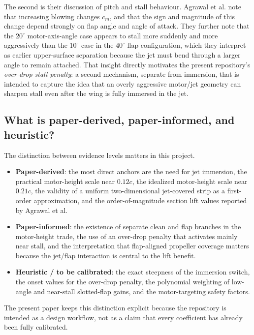 \documentclass[conf]{new-aiaa}
\begin{document}
The second is their discussion of pitch and stall behaviour. Agrawal et al. note that increasing blowing changes \(c_m\), and that the sign and magnitude of this change depend strongly on flap angle and angle of attack.\cite{Agrawal2019} They further note that the \(20^\circ\) motor-axis-angle case appears to stall more suddenly and more aggressively than the \(10^\circ\) case in the \(40^\circ\) flap configuration, which they interpret as earlier upper-surface separation because the jet must bend through a larger angle to remain attached.\cite{Agrawal2019} That insight directly motivates the present repository's \emph{over-drop stall penalty}: a second mechanism, separate from immersion, that is intended to capture the idea that an overly aggressive motor/jet geometry can sharpen stall even after the wing is fully immersed in the jet.

\subsection{What is paper-derived, paper-informed, and heuristic?}

The distinction between evidence levels matters in this project.

\begin{itemize}
\item \textbf{Paper-derived}: the most direct anchors are the need for jet immersion, the practical motor-height scale near \(0.12c\), the idealized motor-height scale near \(0.21c\), the validity of a uniform two-dimensional jet-covered strip as a first-order approximation, and the order-of-magnitude section lift values reported by Agrawal et al.\cite{Hawkswell2022,Agrawal2019}
\item \textbf{Paper-informed}: the existence of separate clean and flap branches in the motor-height trade, the use of an over-drop penalty that activates mainly near stall, and the interpretation that flap-aligned propeller coverage matters because the jet/flap interaction is central to the lift benefit.\cite{Hawkswell2022,Agrawal2019}
\item \textbf{Heuristic / to be calibrated}: the exact steepness of the immersion switch, the onset values for the over-drop penalty, the polynomial weighting of low-angle and near-stall slotted-flap gains, and the motor-targeting safety factors.
\end{itemize}

The present paper keeps this distinction explicit because the repository is intended as a design workflow, not as a claim that every coefficient has already been fully calibrated.
\end{document}
